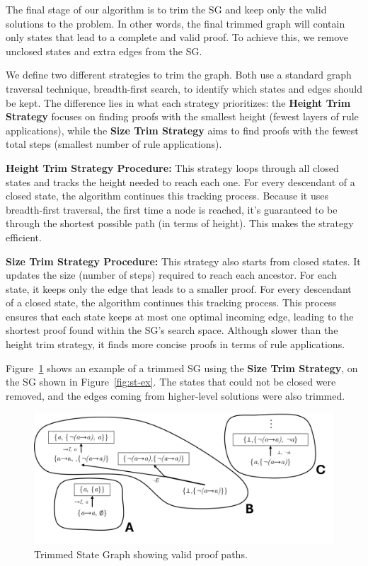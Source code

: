 The final stage of our algorithm is to trim the SG and keep only the valid solutions to the problem. In other words, the final trimmed graph will contain only states that lead to a complete and valid proof. To achieve this, we remove unclosed states and extra edges from the SG.

We define two different strategies to trim the graph. Both use a standard graph traversal technique, breadth-first search, to identify which states and edges should be kept. The difference lies in what each strategy prioritizes: the \textbf{Height Trim Strategy} focuses on finding proofs with the smallest height (fewest layers of rule applications), while the \textbf{Size Trim Strategy} aims to find proofs with the fewest total steps (smallest number of rule applications).


\vspace{1em}
\textbf{Height Trim Strategy Procedure:}  
This strategy loops through all closed states and tracks the height needed to reach each one. For every descendant of a closed state, the algorithm continues this tracking process. Because it uses breadth-first traversal, the first time a node is reached, it’s guaranteed to be through the shortest possible path (in terms of height). This makes the strategy efficient.

\vspace{0.5em}
\textbf{Size Trim Strategy Procedure:}  
This strategy also starts from closed states. It updates the size (number of steps) required to reach each ancestor. For each state, it keeps only the edge that leads to a smaller proof. For every descendant
of a closed state, the algorithm continues this tracking process. This process ensures that each state keeps at most one optimal incoming edge, leading to the shortest proof found within the SG's search space. Although slower than the height trim strategy, it finds more concise proofs in terms of rule applications.

\vspace{1em}
Figure~\ref{fig:sg-trim} shows an example of a trimmed SG using the \textbf{Size Trim Strategy}, on the SG shown in Figure~\ref{fig:st-ex}. The states that could not be closed were removed, and the edges coming from higher-level solutions were also trimmed.

\begin{figure}
    \centering
    \includegraphics[width=1\linewidth]{resources/sg-final.jpg}
    \caption{Trimmed State Graph showing valid proof paths.}
    \label{fig:sg-trim}
\end{figure}

